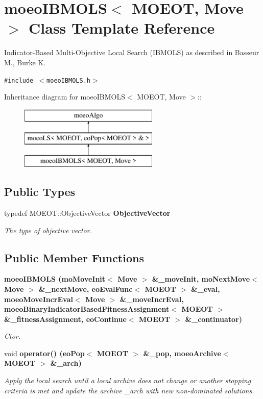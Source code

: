 \section{moeo\-IBMOLS$<$ MOEOT, Move $>$ Class Template Reference}
\label{classmoeoIBMOLS}
Indicator-Based Multi-Objective Local Search (IBMOLS) as described in Basseur M., Burke K.  


{\tt \#include $<$moeo\-IBMOLS.h$>$}

Inheritance diagram for moeo\-IBMOLS$<$ MOEOT, Move $>$::\begin{figure}[H]
\begin{center}
\leavevmode
\includegraphics[height=3cm]{classmoeoIBMOLS}
\end{center}
\end{figure}
\subsection*{Public Types}
\begin{CompactItemize}
\item 
typedef MOEOT::Objective\-Vector \bf{Objective\-Vector}\label{classmoeoIBMOLS_d3433001dcc9a6e2a967aa5d64163935}

\begin{CompactList}\small\item\em The type of objective vector. \item\end{CompactList}\end{CompactItemize}
\subsection*{Public Member Functions}
\begin{CompactItemize}
\item 
\bf{moeo\-IBMOLS} (mo\-Move\-Init$<$ Move $>$ \&\_\-move\-Init, mo\-Next\-Move$<$ Move $>$ \&\_\-next\-Move, eo\-Eval\-Func$<$ MOEOT $>$ \&\_\-eval, \bf{moeo\-Move\-Incr\-Eval}$<$ Move $>$ \&\_\-move\-Incr\-Eval, \bf{moeo\-Binary\-Indicator\-Based\-Fitness\-Assignment}$<$ MOEOT $>$ \&\_\-fitness\-Assignment, eo\-Continue$<$ MOEOT $>$ \&\_\-continuator)
\begin{CompactList}\small\item\em Ctor. \item\end{CompactList}\item 
void \bf{operator()} (eo\-Pop$<$ MOEOT $>$ \&\_\-pop, \bf{moeo\-Archive}$<$ MOEOT $>$ \&\_\-arch)
\begin{CompactList}\small\item\em Apply the local search until a local archive does not change or another stopping criteria is met and update the archive \_\-arch with new non-dominated solutions. \item\end{CompactList}\end{CompactItemize}
